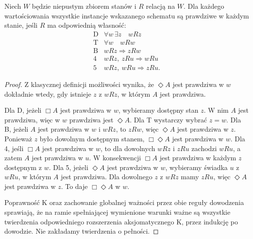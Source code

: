 \begin{lemat}
\label{lem:ncl-modal-frame-sufficient}
Niech $W$ będzie niepustym zbiorem stanów
i $R$ relacją na $W$. Dla każdego wartościowania
wszystkie instancje wskazanego schematu są
prawdziwe w każdym stanie, jeśli $R$ ma
odpowiednią własność:
\[
\begin{array}{c|l}
 \mathrm D&\forall w\,\exists z\quad wRz\\
 \mathrm T&\forall w\quad wRw\\
 \mathrm B& wRz\Longrightarrow zRw\\
 4&wRz,\ zRu\Longrightarrow wRu\\
 5&wRz,\ wRu\Longrightarrow zRu.
\end{array}
\]
\end{lemat}
\begin{proof}
Z klasycznej definicji możliwości wynika,
że $\Diamond A$ jest prawdziwa w $w$ dokładnie
wtedy, gdy istnieje $z$ z $wRz$, w którym
$A$ jest prawdziwa.

Dla D, jeżeli $\Box A$ jest prawdziwa w $w$,
wybieramy dostępny stan $z$. W nim $A$ jest
prawdziwa, więc w $w$ prawdziwa jest $\Diamond A$.
Dla T wystarczy wybrać $z=w$.
Dla B, jeżeli $A$ jest prawdziwa w $w$ i $wRz$,
to $zRw$, więc $\Diamond A$ jest prawdziwa w $z$.
Ponieważ $z$ było dowolnym dostępnym stanem,
$\Box\Diamond A$ jest prawdziwa w $w$.
Dla 4, jeśli $\Box A$ jest prawdziwa w $w$,
to dla dowolnych $wRz$ i $zRu$ zachodzi $wRu$,
a zatem $A$ jest prawdziwa w $u$.
W konsekwencji $\Box A$ jest prawdziwa w każdym
$z$ dostępnym z $w$.
Dla 5, jeżeli $\Diamond A$ jest prawdziwa w $w$,
wybieramy świadka $u$ z $wRu$, w którym $A$
jest prawdziwa. Dla dowolnego $z$ z $wRz$
mamy $zRu$, więc $\Diamond A$ jest prawdziwa w $z$.
To daje $\Box\Diamond A$ w $w$.

Poprawność K oraz zachowanie globalnej ważności
przez obie reguły dowodzenia sprawiają,
że na ramie spełniającej wymienione warunki
ważne są wszystkie twierdzenia odpowiedniego
rozszerzenia aksjomatycznego K, przez indukcję
po dowodzie. Nie zakładamy twierdzenia o pełności.
\end{proof}


